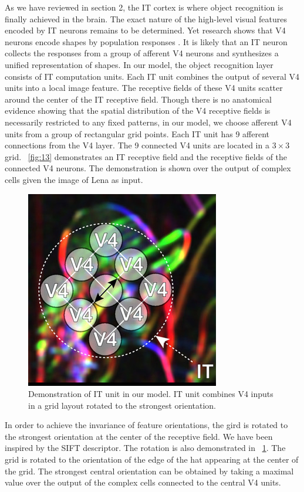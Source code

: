 \documentclass[10pt]{article}
\begin{document}
As we have reviewed in section 2,
the IT cortex is where object recognition is finally achieved in the brain.
The exact nature of the high-level visual features 
encoded by IT neurons remains to be determined.
Yet research shows that V4 neurons encode shapes by population responses \cite{pasupathy2002}.
It is likely that an IT neuron collects the responses from a group of afferent V4 neurons 
and synthesizes a unified representation of shapes.
In our model, the object recognition layer consists of IT computation units.
Each IT unit combines the output of several V4 units into a local image feature.
The receptive fields of these V4 units scatter around the center of the IT receptive field.
Though there is no anatomical evidence showing that 
the spatial distribution of the V4 receptive fields 
is necessarily restricted to any fixed patterns,
in our model, we choose afferent V4 units from a group of rectangular grid points.
Each IT unit has 9 afferent connections from the V4 layer.
The 9 connected V4 units are located in a $3\times 3$ grid.
\figurename~\ref{fig:13} demonstrates an IT receptive field 
and the receptive fields of the connected V4 neurons.
The demonstration is shown over
the output of complex cells given the image of Lena as input.

\begin{figure}
\centering
\includegraphics[width=0.5\linewidth]{images/fig-14.jpg}
\caption{Demonstration of IT unit in our model. 
IT unit combines V4 inputs in a grid layout rotated to the strongest orientation.}
\label{fig:14}
\end{figure}

In order to achieve the invariance of feature orientations,
the gird is rotated to the strongest orientation at the center of the receptive field.
We have been inspired by the SIFT \cite{lowe1999} descriptor.
The rotation is also demonstrated in \figurename~\ref{fig:14}.
The grid is rotated to the orientation of the edge of the hat appearing at the center of the grid.
The strongest central orientation can be obtained by taking a maximal value 
over the output of the complex cells connected to the central V4 units.
\end{document}
